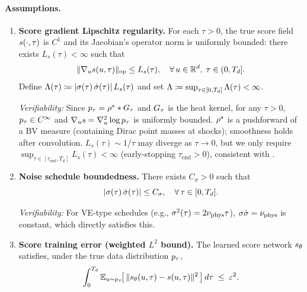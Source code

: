 \paragraph{Assumptions.}
\begin{enumerate}
\item[(A1)] \textbf{Score gradient Lipschitz regularity.} For each $\tau > 0$, the true score field $s(\cdot, \tau)$ is $C^{1}$ and its Jacobian's operator norm is uniformly bounded: there exists $L_{s}(\tau) < \infty$ such that
\begin{equation}
\lVert \nabla_{u} s(u, \tau) \rVert_{\mathrm{op}} \le L_{s}(\tau), \quad \forall\, u \in \mathbb{R}^{d},\; \tau \in (0, T_{d}].
\label{eq:thm2-assum-A1}
\end{equation}
Define $\Lambda(\tau) \coloneqq \lvert \sigma(\tau)\,\dot\sigma(\tau) \rvert\,L_{s}(\tau)$ and set $\Lambda \coloneqq \sup_{\tau \in [0, T_{d}]} \Lambda(\tau) < \infty$.

\textit{Verifiability:} Since $p_{\tau} = \rho^{\star} \ast G_{\tau}$ and $G_{\tau}$ is the heat kernel, for any $\tau > 0$, $p_{\tau} \in C^{\infty}$ and $\nabla_{u} s = \nabla_{u}^{2} \log p_{\tau}$ is uniformly bounded. $\rho^{\star}$ is a pushforward of a BV measure (containing Dirac point masses at shocks); smoothness holds after convolution. $L_{s}(\tau) \sim 1/\tau$ may diverge as $\tau \to 0$, but we only require $\sup_{\tau \in [\tau_{\mathrm{end}}, T_{d}]} L_{s}(\tau) < \infty$ (early-stopping $\tau_{\mathrm{end}} > 0$), consistent with \citet{sarkar2026scoreshocks}.

\item[(A2)] \textbf{Noise schedule boundedness.} There exists $C_{\sigma} > 0$ such that
\begin{equation}
\lvert \sigma(\tau)\,\dot\sigma(\tau) \rvert \le C_{\sigma}, \quad \forall\, \tau \in [0, T_{d}].
\label{eq:thm2-assum-A2}
\end{equation}

\textit{Verifiability:} For VE-type schedules (e.g., $\sigma^{2}(\tau) = 2\nu_{\mathrm{phys}} \tau$), $\sigma \dot\sigma = \nu_{\mathrm{phys}}$ is constant, which directly satisfies this.

\item[(A3)] \textbf{Score training error (weighted $L^{2}$ bound).} The learned score network $s_{\theta}$ satisfies, under the true data distribution $p_{\tau}$,
\begin{equation}
\int_{0}^{T_{d}} \mathbb{E}_{u \sim p_{\tau}}\!\bigl[\,\lVert s_{\theta}(u, \tau) - s(u, \tau) \rVert^{2}\,\bigr] \, d\tau \;\le\; \varepsilon^{2}.
\label{eq:thm2-assum-A3}
\end{equation}


\end{enumerate}
